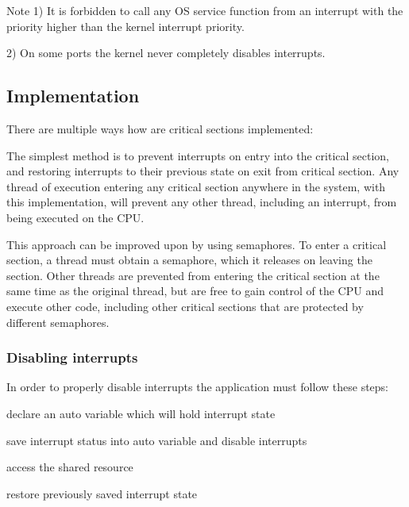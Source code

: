 \begin{DoxyNote}{Note}
1) It is forbidden to call any O\-S service function from an interrupt with the priority higher than the kernel interrupt priority. 

2) On some ports the kernel never completely disables interrupts.
\end{DoxyNote}
\hypertarget{critical_section_cs_implementation}{}\subsection{Implementation}\label{critical_section_cs_implementation}
There are multiple ways how are critical sections implemented\-:
\begin{DoxyItemize}
\item The simplest method is to prevent interrupts on entry into the critical section, and restoring interrupts to their previous state on exit from critical section. Any thread of execution entering any critical section anywhere in the system, with this implementation, will prevent any other thread, including an interrupt, from being executed on the C\-P\-U.
\item This approach can be improved upon by using semaphores. To enter a critical section, a thread must obtain a semaphore, which it releases on leaving the section. Other threads are prevented from entering the critical section at the same time as the original thread, but are free to gain control of the C\-P\-U and execute other code, including other critical sections that are protected by different semaphores.
\end{DoxyItemize}\hypertarget{critical_section_cs_interrupt_lock}{}\subsubsection{Disabling interrupts}\label{critical_section_cs_interrupt_lock}
In order to properly disable interrupts the application must follow these steps\-:
\begin{DoxyItemize}
\item declare an {\ttfamily auto} variable which will hold interrupt state
\item save interrupt status into {\ttfamily auto} variable and disable interrupts
\item access the shared resource
\item restore previously saved interrupt state
\end{DoxyItemize}

